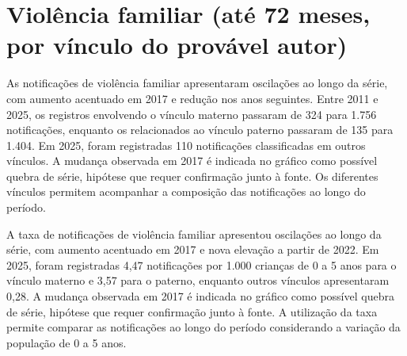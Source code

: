 \section{Violência familiar (até 72 meses, por vínculo do provável autor)}


As notificações de violência familiar apresentaram oscilações ao longo da série, com aumento acentuado em 2017 e redução nos anos seguintes. Entre 2011 e 2025, os registros envolvendo o vínculo materno passaram de 324 para 1.756 notificações, enquanto os relacionados ao vínculo paterno passaram de 135 para 1.404. Em 2025, foram registradas 110 notificações classificadas em outros vínculos. A mudança observada em 2017 é indicada no gráfico como possível quebra de série, hipótese que requer confirmação junto à fonte. Os diferentes vínculos permitem acompanhar a composição das notificações ao longo do período.


A taxa de notificações de violência familiar apresentou oscilações ao longo da série, com aumento acentuado em 2017 e nova elevação a partir de 2022. Em 2025, foram registradas 4,47 notificações por 1.000 crianças de 0 a 5 anos para o vínculo materno e 3,57 para o paterno, enquanto outros vínculos apresentaram 0,28. A mudança observada em 2017 é indicada no gráfico como possível quebra de série, hipótese que requer confirmação junto à fonte. A utilização da taxa permite comparar as notificações ao longo do período considerando a variação da população de 0 a 5 anos.


